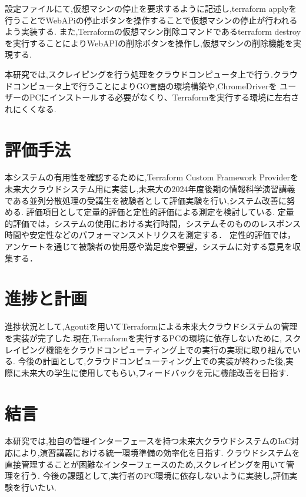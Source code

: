 \documentclass[11pt]{ujarticle}\sloppy
\begin{document}
設定ファイルにて,仮想マシンの停止を要求するように記述し,terraform applyを行うことでWebAPiの停止ボタンを操作することで仮想マシンの停止が行われるよう実装する.
また,Terraformの仮想マシン削除コマンドであるterraform destroyを実行することによりWebAPIの削除ボタンを操作し,仮想マシンの削除機能を実現する.


本研究では,スクレイピングを行う処理をクラウドコンピュータ上で行う.クラウドコンピュータ上で行うことによりGO言語の環境構築や,ChromeDriverを
ユーザーのPCにインストールする必要がなくり、Terraformを実行する環境に左右されにくくなる.



\section{評価手法}

本システムの有用性を確認するために,Terraform Custom Framework Providerを未来大クラウドシステム用に実装し,未来大の2024年度後期の情報科学演習講義である並列分散処理の受講生を被験者として評価実験を行い,システム改善に努める.
評価項目として定量的評価と定性的評価による測定を検討している.
定量的評価では，システムの使用における実行時間，システムそのもののレスポンス時間や安定性などのパフォーマンスメトリクスを測定する．
定性的評価では，アンケートを通じて被験者の使用感や満足度や要望，システムに対する意見を収集する．



\section{進捗と計画}

進捗状況として,Agoutiを用いてTerraformによる未来大クラウドシステムの管理を実装が完了した.現在,Terraformを実行するPCの環境に依存しないために,
スクレイピング機能をクラウドコンピューティング上での実行の実現に取り組んでいる.
今後の計画として,クラウドコンピューティング上での実装が終わった後,実際に未来大の学生に使用してもらい,フィードバックを元に機能改善を目指す.


\section{結言}

本研究では,独自の管理インターフェースを持つ未来大クラウドシステムのIaC対応により,演習講義における統一環境準備の効率化を目指す.
クラウドシステムを直接管理することが困難なインターフェースのため,スクレイピングを用いて管理を行う.
今後の課題として,実行者のPC環境に依存しないように実装し,評価実験を行いたい.
\end{document}
